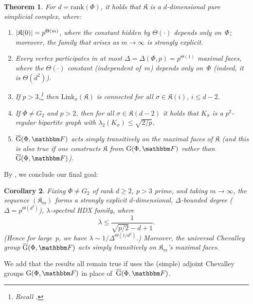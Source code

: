 \documentclass[10pt,a4paper]{article}
\newtheorem{theorem}{Theorem}[section]
\newtheorem{corollary}[theorem]{Corollary}
\theoremstyle{definition}
\newcommand{\poly}{\textnormal{poly}}
\newcommand{\F}{\mathbbm F}
\newcommand{\ol}[1]{\overline{#1}}
\DeclarePairedDelimiter\abs{\lvert}{\rvert}
\newcommand{\rnote}[1]{}
\newcommand{\Esc}[2]{\ol{\mathrm{G}}(#1,#2)}
\newcommand{\Gad}[2]{\mathrm{G}(#1,#2)}
\newcommand{\rank}{{\mathrm{rank}}}
\newcommand{\Link}{\mathrm{Link}}
\newcommand{\complex}{\mathfrak{K}}
\begin{document}
\begin{theorem}\label{thm:main}
    For $d = \rank(\Phi)$, it holds that $\complex$ is a $d$-dimensional pure simplicial complex, where:
\begin{enumerate}
\item $\abs{\complex(0)} = p^{\Theta(m)}$, where the constant hidden by $\Theta(\cdot)$ depends only on~$\Phi$; moreover, the family that arises as $m \to \infty$ is strongly explicit.
\rnote{would be good to quantify.  For example, I believe that when you increment $m$ by $+1$, the size of $\complex(0)$ grows by $p^{\poly(d)}$, where the polynomial depends on~$\Phi$.}%
\item Every vertex participates in at most $\Delta = \Delta(\Phi, p) = p^{\Theta(1)}$ maximal faces,  where the $\Theta(\cdot)$ constant (independent of~$m$) depends only on~$\Phi$ (indeed, it is $\Theta(d^2)$).
\item If $p > 3$,\footnote{Recall .} then $\Link_\sigma(\complex)$ is connected for all $\sigma \in \complex(i)$, $i \leq d-2$.
\item If $\Phi \neq G_2$ and $p > 2$, then for all $\sigma \in \complex(d-2)$ it holds that $K_\sigma$ is a $p^2$-regular bipartite graph with $\lambda_2(K_\sigma) \leq \sqrt{2/p}$.
\item $\Esc{\Phi}{\F}$ acts simply transitively on the maximal faces of $\complex$ (and this is also true if one constructs $\complex$ from $\Gad{\Phi}{\F}$ rather than $\Esc{\Phi}{\F}$).
\end{enumerate}
\end{theorem}


By , we conclude our final goal:
\begin{corollary}
    Fixing $\Phi \neq G_2$ of rank $d \geq 2$, $p>3$ prime, and taking $m \to \infty$, the sequence $(\complex_m)$ forms a strongly explicit $d$-dimensional, $\Delta$-bounded degree ($\Delta = p^{\Theta(d^2)}$), $\lambda$-spectral HDX family, where
	\[\lambda \le \frac{1}{\sqrt{p/2} - d + 1}.\]
    (Hence for large~$p$, we have $\lambda \sim 1/\Delta^{\Theta(1/d^2)}$.)
    Moreover, the universal Chevalley group $\Esc{\Phi}{\F}$ acts simply transitively on $\complex_m$'s maximal faces.
\end{corollary}
We add that the results all remain true if uses the (simple) adjoint Chevalley groups $\Gad{\Phi}{\F}$ in place of~$\Esc{\Phi}{\F}$.
\end{document}
